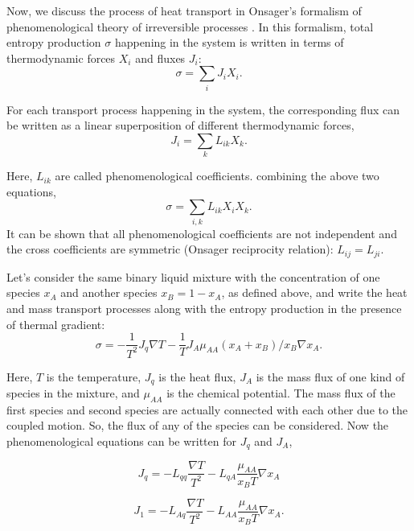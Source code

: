     Now, we discuss the process of heat transport in Onsager's formalism of phenomenological theory of irreversible processes \cite{degroot}. In this formalism, total entropy production $\sigma$ happening in the system is written in terms of thermodynamic forces $X_i$ and fluxes $J_i$:
    \begin{equation}
        \sigma = \sum_i J_i X_i.
    \end{equation}
    
    For each transport process happening in the system, the corresponding flux can be written as a linear superposition of different thermodynamic forces,
    \begin{equation}
        J_i = \sum_k L_{ik}X_k.
    \end{equation}
    
    Here, $L_{ik}$ are called phenomenological coefficients. combining the above two equations,
    \begin{equation}
        \sigma = \sum_{i,k} L_{ik} X_i X_k.
    \end{equation}
    It can be shown that all phenomenological coefficients are not independent and the cross coefficients are symmetric (Onsager reciprocity relation): $L_{ij} = L_{ji}$.
    
    Let's consider the same binary liquid mixture with the concentration of one species $x_A$ and another species $x_B = 1-x_A$, as defined above, and write the heat and mass transport processes along with the entropy production in the presence of thermal gradient:
    \begin{equation}
        \sigma = -\frac{1}{T^2} J_q \nabla T - \frac{1}{T} J_A \mu_{AA} (x_A+x_B)/x_B \nabla x_A.
    \end{equation}
    
    Here, $T$ is the temperature, $J_q$ is the heat flux, $J_A$ is the mass flux of one kind of species in the mixture, and $\mu_{AA}$ is the chemical potential. The mass flux of the first species and second species are actually connected with each other due to the coupled motion. So, the flux of any of the species can be considered. Now the phenomenological equations can be written for $J_q$ and $J_A$,
    
    \begin{equation}
        J_q = -L_{qq} \frac{\nabla T}{T^2} - L_{qA} \frac{\mu_{AA}}{x_BT}\nabla x_A
    \end{equation}
    
    \begin{equation}
        J_1 = -L_{Aq}\frac{\nabla T}{T^2} - L_{AA} \frac{\mu_{AA}}{x_BT}\nabla x_A.
    \end{equation}
    
